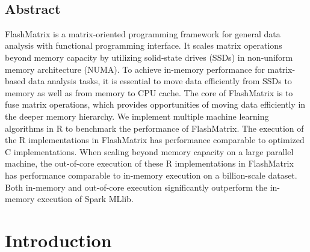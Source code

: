 \documentclass[letterpaper,twocolumn,10pt]{article}
\newcommand{\dz}[1]{{\color{blue}{\it DZ: #1}}}
\begin{document}
\date{}

\title{%
}


\maketitle

\thispagestyle{empty}


\subsection*{Abstract}
FlashMatrix is a matrix-oriented programming framework for general data analysis
with functional programming interface. It scales matrix operations
beyond memory capacity by utilizing solid-state drives (SSDs) in non-uniform
memory architecture (NUMA). To achieve in-memory performance for matrix-based
data analysis tasks, it is essential to move data efficiently from SSDs to
memory as well as from memory to CPU cache. The core of FlashMatrix is to
fuse matrix operations, which provides opportunities of moving data efficiently
in the deeper memory hierarchy.
\dz{Our techniques for efficient data movement: XXX.}
We implement multiple machine learning algorithms in R to benchmark
the performance of FlashMatrix. The execution of the R implementations in
FlashMatrix has performance comparable to optimized C implementations.
When scaling beyond memory capacity on a large parallel machine, the out-of-core
execution of these R implementations in FlashMatrix has performance comparable
to in-memory execution on a billion-scale dataset. Both in-memory and
out-of-core execution significantly outperform the in-memory execution of
Spark MLlib.

\section{Introduction}

\end{document}
